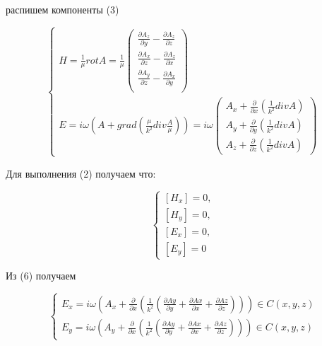 	распишем компоненты (3)
	
	\begin{equation}
		\begin{cases}
			 H = \frac{1}{\mu}rot A = \frac{1}{\mu}\begin{pmatrix}    \frac{\partial A_z}{\partial y} - \frac{\partial A_z}{\partial z} \\ \frac{\partial A_x}{\partial z} - \frac{\partial A_z}{\partial x} \\ \frac{\partial A_y}{\partial z} - \frac{\partial A_x}{\partial y} \\
			\end{pmatrix}  \\       E = i \omega (A + grad(\frac{\mu}{k^2}div\frac{A}{\mu})) = i \omega {\begin{pmatrix} A_x + \frac{\partial }{\partial x}(\frac{1}{k^2}divA) \\           A_y + \frac{\partial }{\partial y}(\frac{1}{k^2}divA) \\       A_z + \frac{\partial }{\partial z}(\frac{1}{k^2}divA)                                          \end{pmatrix}}         
		 \end{cases}
	\end{equation}
	
	\newpage
	
	Для выполнения (2)  получаем что:
	
	\begin{equation*}
		\tag{2.1}\begin{cases} [H_{x} ] = 0, \\  [H_{y} ] = 0, \\ [E_{x}] = 0, \\  [E_{y} ] = 0 \end{cases}
	\end{equation*}
	
	Из (6) получаем
	
	\begin{equation*}
		\tag{6.1} \begin{cases}    E_x = i\omega(A_x + \frac{\partial}{\partial x}(\frac{1}{k^2}(\frac{\partial Ay}{\partial y} + \frac{\partial Ax}{\partial x} + \frac{\partial Az}{\partial z}))) \in C(x, y, z) \\  E_y = i\omega(A_y + \frac{\partial}{\partial x}(\frac{1}{k^2}(\frac{\partial Ay}{\partial y} + \frac{\partial Ax}{\partial x} + \frac{\partial Az}{\partial z})))    \in C(x, y, z)\end{cases}
	\end{equation*}
	
